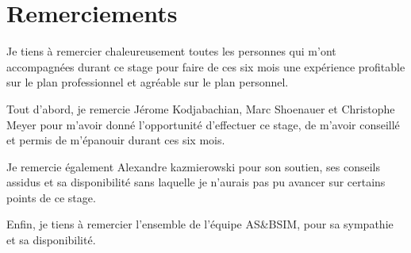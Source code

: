 
\section*{Remerciements}
\bigskip
Je tiens à remercier chaleureusement toutes les personnes qui m'ont accompagnées durant ce stage pour faire de ces six mois une expérience  profitable sur le plan professionnel et agréable sur le plan personnel.


\noindent Tout d'abord, je remercie Jérome Kodjabachian, Marc Shoenauer et Christophe Meyer pour m'avoir donné l'opportunité d'effectuer ce stage, de m'avoir conseillé et  permis de m'épanouir durant ces six mois.


\noindent Je remercie également Alexandre kazmierowski pour son soutien, ses conseils assidus et sa disponibilité sans laquelle je n'aurais pas pu avancer sur certains points de ce stage.   


\noindent Enfin, je tiens à remercier l'ensemble de l'équipe AS\&BSIM, pour sa sympathie et sa disponibilité.

